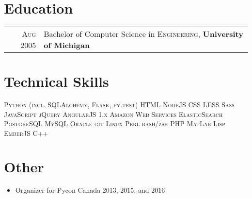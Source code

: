 \documentclass[a4paper,10pt]{article}
\begin{document}
    
        \section{Education}
        \begin{tabular}{rl}
        \textsc{Aug} 2005 & Bachelor of Computer Science in \textsc{Engineering}, \textbf{University of Michigan}\\
        \end{tabular}
    

    
        \section{Technical Skills}

        \textsc{Python (incl. SQLAlchemy, Flask, py.test)} 
        \textsc{HTML} 
        \textsc{NodeJS} 
        \textsc{CSS} 
        \textsc{LESS} 
        \textsc{Sass} 
        \textsc{JavaScript} 
        \textsc{jQuery} 
        \textsc{AngularJS 1.x} 
        \textsc{Amazon Web Services} 
        \textsc{ElasticSearch} 
        \textsc{PostgreSQL} 
        \textsc{MySQL} 
        \textsc{Oracle} 
        \textsc{git} 
        \textsc{Linux} 
        \textsc{Perl} 
        \textsc{bash/zsh} 
        \textsc{PHP} 
        \textsc{MatLab} 
        \textsc{Lisp} 
        \textsc{EmberJS} 
        \textsc{C++}
    

    
    \section {Other}
    \begin{itemize}
        \item Organizer for Pycon Canada 2013, 2015, and 2016
    \end{itemize}
    
\end{document}
